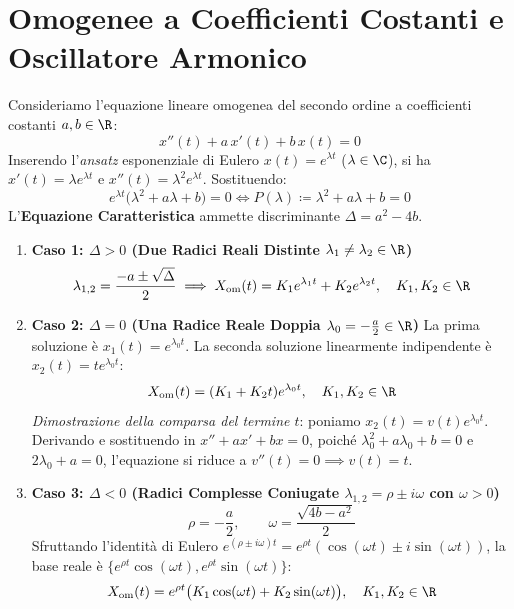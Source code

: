 \section{Omogenee a Coefficienti Costanti e Oscillatore Armonico}
\label{sec:omogenee_costanti}

Consideriamo l'equazione lineare omogenea del secondo ordine a coefficienti costanti $a, b \in \R$:
\begin{equation}
    \label{eq:omogenea_costanti}
    x''(t) + a\, x'(t) + b\, x(t) = 0
\end{equation}
Inserendo l'\emph{ansatz} esponenziale di Eulero $x(t) = e^{\lambda t}$ ($\lambda \in \C$), si ha $x'(t) = \lambda e^{\lambda t}$ e $x''(t) = \lambda^2 e^{\lambda t}$. Sostituendo:
\[
    e^{\lambda t} \big( \lambda^2 + a\lambda + b \big) = 0 \iff P(\lambda) \coloneqq \lambda^2 + a\lambda + b = 0
\]
L'\textbf{Equazione Caratteristica} ammette discriminante $\Delta = a^2 - 4b$.

\begin{metodo}
\begin{enumerate}
    \item \textbf{Caso 1: $\Delta > 0$ (Due Radici Reali Distinte $\lambda_1 \neq \lambda_2 \in \R$)}
    \[
        \lambda_{1,2} = \frac{-a \pm \sqrt{\Delta}}{2} \implies X_{\text{om}}(t) = K_1 e^{\lambda_1 t} + K_2 e^{\lambda_2 t}, \quad K_1, K_2 \in \R
    \]

    \item \textbf{Caso 2: $\Delta = 0$ (Una Radice Reale Doppia $\lambda_0 = -\frac{a}{2} \in \R$)}
    La prima soluzione è $x_1(t) = e^{\lambda_0 t}$. La seconda soluzione linearmente indipendente è $x_2(t) = t e^{\lambda_0 t}$:
    \[
        X_{\text{om}}(t) = (K_1 + K_2 t) e^{\lambda_0 t}, \quad K_1, K_2 \in \R
    \]
    \emph{Dimostrazione della comparsa del termine $t$}: poniamo $x_2(t) = v(t) e^{\lambda_0 t}$. Derivando e sostituendo in $x'' + ax' + bx = 0$, poiché $\lambda_0^2 + a\lambda_0 + b = 0$ e $2\lambda_0 + a = 0$, l'equazione si riduce a $v''(t) = 0 \implies v(t) = t$.

    \item \textbf{Caso 3: $\Delta < 0$ (Radici Complesse Coniugate $\lambda_{1,2} = \rho \pm i\omega$ con $\omega > 0$)}
    \[
        \rho = -\frac{a}{2}, \qquad \omega = \frac{\sqrt{4b - a^2}}{2}
    \]
    Sfruttando l'identità di Eulero $e^{(\rho \pm i\omega)t} = e^{\rho t}(\cos(\omega t) \pm i\sin(\omega t))$, la base reale è $\{e^{\rho t}\cos(\omega t), e^{\rho t}\sin(\omega t)\}$:
    \[
        X_{\text{om}}(t) = e^{\rho t} \big( K_1 \cos(\omega t) + K_2 \sin(\omega t) \big), \quad K_1, K_2 \in \R
    \]
\end{enumerate}
\end{metodo}

